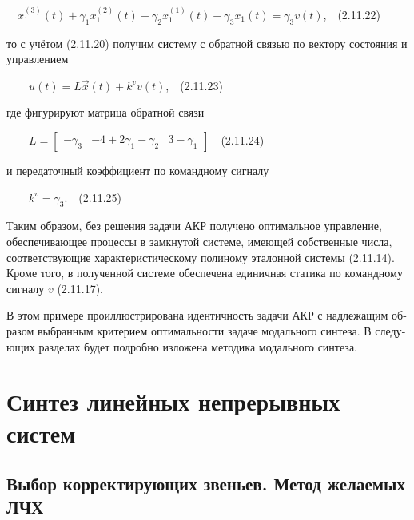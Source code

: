 \documentclass[a4paper]{article}
\begin{document}
{\begin{russian}\sffamily
\ \  $x_1^{(3)}(t)+γ_1x_1^{(2)}(t)+γ_2x_1^{(1)}(t)+γ_3x_1(t)=γ_3v(t)$,\ \ (2.11.22)
\end{russian}}

{\begin{russian}\sffamily
то с учётом (2.11.20) получим систему с обратной связью по вектору состояния и управлением
\end{russian}}

{\begin{russian}\sffamily
\ \ \ \  $u(t)=L\vec x(t)+k^vv(t)$,\ \ (2.11.23)
\end{russian}}

{\begin{russian}\sffamily
где фигурируют матрица обратной связи
\end{russian}}

{\begin{russian}\sffamily
\ \ \ \  $L=\left[\begin{matrix}-γ_3&-4+2γ_1-γ_2&3-γ_1\end{matrix}\right]$\ \ (2.11.24)
\end{russian}}

{\begin{russian}\sffamily
и передаточный коэффициент по командному сигналу
\end{russian}}

{\begin{russian}\sffamily
\ \ \ \  $k^v=γ_3$.\ \ (2.11.25)
\end{russian}}

{\begin{russian}\sffamily
Таким образом, без решения задачи АКР получено оптимальное управление, обеспечивающее процессы в замкнутой системе,
имеющей собственные числа, соответствующие характеристическому полиному эталонной системы (2.11.14). Кроме того, в
полученной системе обеспечена единичная статика по командному сигналу  $v$ (2.11.17).
\end{russian}}

{\begin{russian}\sffamily
В этом примере проиллюстрирована идентичность задачи АКР с надлежащим образом выбранным критерием оптимальности задаче
модального синтеза. В следующих разделах будет подробно изложена методика модального синтеза.
\end{russian}}


\bigskip

\clearpage\section{Синтез линейных непрерывных систем}
\hypertarget{RefHeadingToc455659730}{}\subsection{Выбор корректирующих звеньев. Метод желаемых ЛЧХ}
\hypertarget{RefHeadingToc455659731}{}
\bigskip
\end{document}
